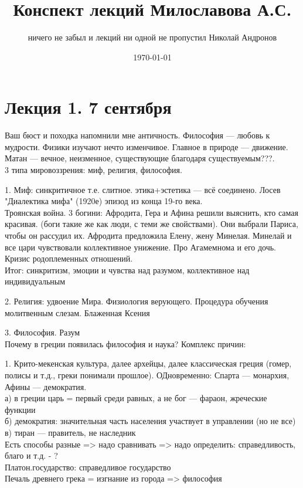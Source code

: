 \documentclass[a4paper,12pt]{article}
\author{ничего не забыл и лекций ни одной не пропустил Николай Андронов}
\title{Конспект лекций Милославова А.С.}
\date{\today}
\begin{document}
\maketitle
\tableofcontents
\section{Лекция 1. 7 сентября}
Ваш бюст и походка напомнили мне античность. Философия --- любовь к мудрости. Физики изучают нечто изменчивое. Главное в природе --- движение. Матан --- вечное, неизменное, существующие благодаря существуемым???.\\
3 типа мировоззрения: миф, религия, философия.

1. Миф: синкритичное т.е. слитное. этика+эстетика --- всё соединено. Лосев "Диалектика мифа" (1920е) эпизод из конца 19-го века. \\
Троянская война. 3 богини: Афродита, Гера и Афина решили выяснить, кто самая красивая. (боги такие же как люди, с теми же свойствами). Они выбрали Париса, чтобы он рассудил их. Афродита предложила Елену, жену Минелая. Минелай и все цари чувствовали коллективное унижение. Про Агамемнома и его дочь. Кризис родоплеменных отношений.\\
Итог: синкритизм, эмоции и чувства над разумом, коллективное над индивидуальным

2. Религия: удвоение Мира. Физиология верующего. Процедура обучения молитвенным слезам. Блаженная Ксения

3. Философия. Разум\\
Почему в греции появилась философия и наука? Комплекс причин:

1. Крито-мекенская культура, далее архейцы, далее классическая греция (гомер, полисы и т.д., греки понимали прошлое). ОДновременно: Спарта --- монархия, Афины --- демократия. \\
а) в греции царь = первый среди равных, а не бог --- фараон, жреческие функции\\
б) демократия: значительная часть населения участвует в управлении (но не все)\\
в) тиран --- правитель, не наследник\\
Есть способы разные => надо сравнивать => надо определить: справедливость, благо и т.д. - ?\\
Платон.государство: справедливое государство\\
Печаль древнего грека = изгнание из города => философия
\end{document}
